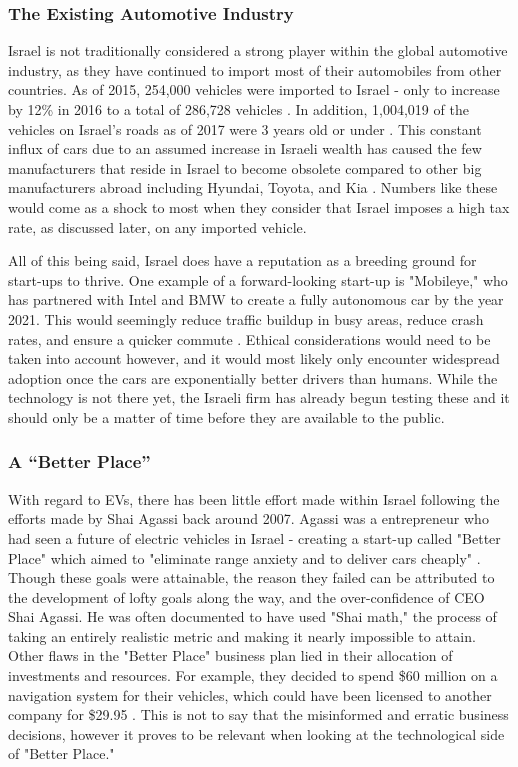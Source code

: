\documentclass{article}                         %
\begin{document}
\subsubsection{The Existing Automotive Industry}
Israel is not traditionally considered a strong player within the global automotive industry, as they have continued to import most of their automobiles from other countries. As of 2015, 254,000 vehicles were imported to Israel - only to increase by 12\% in 2016 to a total of 286,728 vehicles \cite{Halavy20172016Imports}. In addition, 1,004,019 of the vehicles on Israel's roads as of 2017 were 3 years old or under \cite{Halavy20172016Imports}. This constant influx of cars due to an assumed increase in Israeli wealth has caused the few manufacturers that reside in Israel to become obsolete compared to other big manufacturers abroad including Hyundai, Toyota, and Kia \cite{CarLoanWorld2015TheAustrailia}. Numbers like these would come as a shock to most when they consider that Israel imposes a high tax rate, as discussed later, on any imported vehicle. 

All of this being said, Israel does have a reputation as a breeding ground for start-ups to thrive. One example of a forward-looking start-up is "Mobileye," who has partnered with Intel and BMW to create a fully autonomous car by the year 2021. This would seemingly reduce traffic buildup in busy areas, reduce crash rates, and ensure a quicker commute \cite{Lierbermann2016ThreeCar}. Ethical considerations would need to be taken into account however, and it would most likely only encounter widespread adoption once the cars are exponentially better drivers than humans. While the technology is not there yet, the Israeli firm has already begun testing these and it should only be a matter of time before they are available to the public.  


\subsubsection{A ``Better Place''}
With regard to EVs, there has been little effort made within Israel following the efforts made by Shai Agassi back around 2007. Agassi was a entrepreneur who had seen a future of electric vehicles in Israel - creating a start-up called "Better Place" which aimed to "eliminate range anxiety and to deliver cars cheaply" \cite{ChafkinAGoing}. Though these goals were attainable, the reason they failed can be attributed to the development of lofty goals along the way, and the over-confidence of CEO Shai Agassi. He was often documented to have used "Shai math," the process of taking an entirely realistic metric and making it nearly impossible to attain. Other flaws in the "Better Place" business plan lied in their allocation of investments and resources. For example, they decided to spend \$60 million on a navigation system for their vehicles, which could have been licensed to another company for \$29.95 \cite{ChafkinAGoing}. This is not to say that the misinformed and erratic business decisions, however it proves to be relevant when looking at the technological side of "Better Place." 
\end{document}
